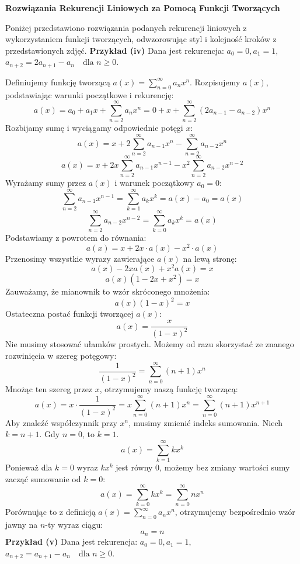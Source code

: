 \documentclass{mwart}
\begin{document}
\begin{mdframed}
    \textbf{Rozwiązania Rekurencji Liniowych za Pomocą Funkcji Tworzących}

    Poniżej przedstawiono rozwiązania podanych rekurencji liniowych z wykorzystaniem funkcji tworzących,
    odwzorowując styl i kolejność kroków z przedstawionych zdjęć. \newline\newline
    \textbf{Przykład (iv)} \newline
    Dana jest rekurencja:
    $a_0 = 0, a_1 = 1,$
    $a_{n+2} = 2a_{n+1} - a_n \quad \text{dla } n \ge 0.$

    Definiujemy funkcję tworzącą $a(x) = \sum_{n=0}^{\infty} a_n x^n$.
    Rozpisujemy $a(x)$, podstawiając warunki początkowe i rekurencję:
    $$ a(x) = a_0 + a_1 x + \sum_{n=2}^{\infty} a_n x^n = 0 + x + \sum_{n=2}^{\infty} (2a_{n-1} - a_{n-2}) x^n $$
    Rozbijamy sumę i wyciągamy odpowiednie potęgi $x$:
    $$ a(x) = x + 2\sum_{n=2}^{\infty} a_{n-1}x^n - \sum_{n=2}^{\infty} a_{n-2}x^n $$
    $$ a(x) = x + 2x\sum_{n=2}^{\infty} a_{n-1}x^{n-1} - x^2\sum_{n=2}^{\infty} a_{n-2}x^{n-2} $$
    Wyrażamy sumy przez $a(x)$ i warunek początkowy $a_0 = 0$:
    $$ \sum_{n=2}^{\infty} a_{n-1}x^{n-1} = \sum_{k=1}^{\infty} a_k x^k = a(x) - a_0 = a(x) $$
    $$ \sum_{n=2}^{\infty} a_{n-2}x^{n-2} = \sum_{k=0}^{\infty} a_k x^k = a(x) $$
    Podstawiamy z powrotem do równania:
    $$ a(x) = x + 2x \cdot a(x) - x^2 \cdot a(x) $$
    Przenosimy wszystkie wyrazy zawierające $a(x)$ na lewą stronę:
    $$ a(x) - 2x a(x) + x^2 a(x) = x $$
    $$ a(x) (1 - 2x + x^2) = x $$
    Zauważamy, że mianownik to wzór skróconego mnożenia:
    $$ a(x) (1 - x)^2 = x $$
    Ostateczna postać funkcji tworzącej $a(x)$:
    $$ a(x) = \frac{x}{(1 - x)^2} $$
    Nie musimy stosować ułamków prostych. Możemy od razu skorzystać ze znanego rozwinięcia w szereg potęgowy:
    $$ \frac{1}{(1-x)^2} = \sum_{n=0}^{\infty} (n+1)x^n $$
    Mnożąc ten szereg przez $x$, otrzymujemy naszą funkcję tworzącą:
    $$ a(x) = x \cdot \frac{1}{(1-x)^2} = x \sum_{n=0}^{\infty} (n+1)x^n = \sum_{n=0}^{\infty} (n+1)x^{n+1} $$
    Aby znaleźć współczynnik przy $x^n$, musimy zmienić indeks sumowania. Niech $k=n+1$. Gdy $n=0$, to $k=1$.
    $$ a(x) = \sum_{k=1}^{\infty} k x^k $$
    Ponieważ dla $k=0$ wyraz $k x^k$ jest równy 0, możemy bez zmiany wartości sumy zacząć sumowanie od $k=0$:
    $$ a(x) = \sum_{k=0}^{\infty} k x^k = \sum_{n=0}^{\infty} n x^n $$
    Porównując to z definicją $a(x) = \sum_{n=0}^{\infty} a_n x^n$, otrzymujemy bezpośrednio wzór jawny na $n$-ty wyraz ciągu:
    $$ a_n = n $$
    \textbf{Przykład (v)} \newline
    Dana jest rekurencja:
    $a_0 = 0, a_1 = 1,$
    $a_{n+2} = a_{n+1} - a_n \quad \text{dla } n \ge 0.$


\end{mdframed}
\end{document}
